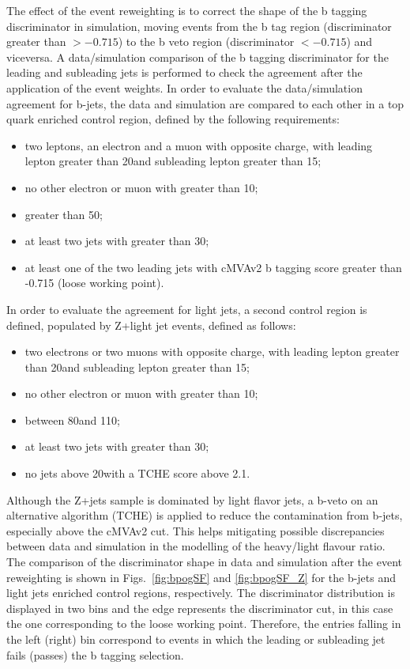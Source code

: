 The effect of the event reweighting is to correct the shape of the b tagging discriminator in simulation, moving events from the b tag region (discriminator greater than $> -0.715$) to the b veto region (discriminator $ < -0.715$) and viceversa. A data/simulation comparison of the b tagging discriminator for the leading and subleading jets is performed to check the agreement after the application of the event weights. In order to evaluate the data/simulation agreement for b-jets, the data and simulation are compared to each other in a top quark enriched control region, defined by the following requirements:
\begin{itemize}
\item two leptons, an electron and a muon with opposite charge, with
leading lepton \pt greater than 20\GeV and subleading lepton \pt greater than 15\GeV;
\item no other electron or muon with \pt greater than 10\GeV;
\item \mll greater than 50\GeV;
\item at least two jets with \pt greater than 30\GeV;
\item at least one of the two leading jets with cMVAv2 b tagging score
greater than -0.715 (loose working point).
\end{itemize}
In order to evaluate the agreement for light jets, a second
control region is defined, populated by Z+light jet events, defined as follows:
\begin{itemize}
\item two electrons or two muons with opposite charge, with
leading lepton \pt greater than 20\GeV and subleading lepton \pt greater than 15\GeV;
\item no other electron or muon with \pt greater than 10\GeV;
\item \mll between 80\GeV and 110\GeV;
\item at least two jets with \pt greater than 30\GeV;
\item no jets above 20\GeV with a TCHE score above 2.1. 
\end{itemize}
Although the Z+jets sample is dominated by light flavor jets, a b-veto on an
alternative algorithm (TCHE) is applied to reduce the contamination from b-jets,
especially above the cMVAv2 cut. This helps mitigating possible discrepancies between data and simulation in the modelling of the heavy/light flavour ratio.
The comparison of the discriminator shape in data and simulation after the event reweighting is shown in Figs.~\ref{fig:bpogSF} and \ref{fig:bpogSF_Z} for the b-jets and light jets enriched control regions, respectively. The discriminator distribution is displayed in two bins and the edge represents the discriminator cut, in this case the one corresponding to the loose working point. Therefore, the entries falling in the left (right) bin correspond to events in which the leading or subleading jet fails (passes) the b tagging selection.

